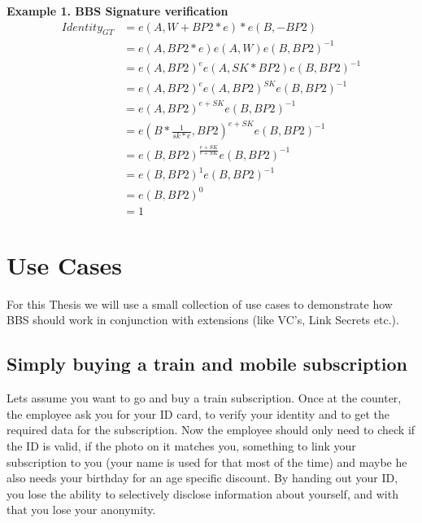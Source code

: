 \documentclass[
	a4paper               %
	,bibliography=totoc   %
	,listof=totoc         %
	,monolingual
	twoside=false,
]{bfhthesis}              %
\begin{document}
\textbf{Example 1. BBS Signature verification}
\begin{equation}
	\begin{split}
		Identity_{GT} & = e(A, W + BP2 * e) * e(B, -BP2) \\
		& = e(A, BP2 * e)e(A, W)e(B, BP2)^{-1} \\
		& = e(A, BP2)^ee(A, SK * BP2)e(B, BP2)^{-1} \\
		& = e(A, BP2)^ee(A, BP2)^{SK}e(B, BP2)^{-1} \\
		& = e(A, BP2)^{e + SK}e(B, BP2)^{-1} \\
		& = e(B * \frac{1}{sk * e}, BP2)^{e + SK}e(B, BP2)^{-1} \\
		& = e(B, BP2)^{\frac{e + SK}{e + SK}}e(B, BP2)^{-1} \\
		& = e(B, BP2)^1e(B, BP2)^{-1} \\
		& = e(B, BP2)^0 \\
		& = 1
	\end{split}
\end{equation}

\chapter{Use Cases}
For this Thesis we will use a small collection of use cases to demonstrate how BBS should work in conjunction with extensions (like VC's, Link Secrets etc.).

\section{Simply buying a train and mobile subscription}
Lets assume you want to go and buy a train subscription.
Once at the counter, the employee ask you for your ID card, to verify your identity and to get the required data for the subscription.
Now the employee should only need to check if the ID is valid, if the photo on it matches you, something to link your subscription to you (your name is used for that most of the time) and maybe he also needs your birthday for an age specific discount.
By handing out your ID, you lose the ability to selectively disclose information about yourself, and with that you lose your anonymity.
\end{document}
